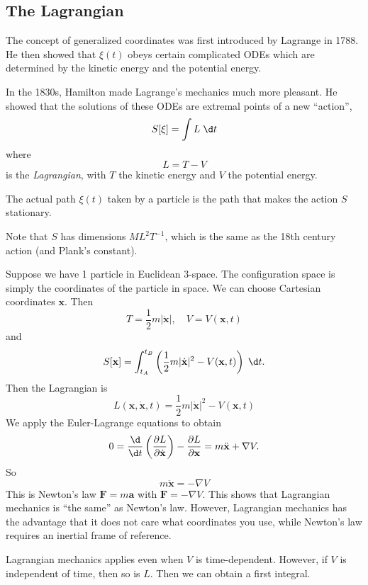\documentclass[a4paper]{article}
\begin{document}
\subsection{The Lagrangian}
The concept of generalized coordinates was first introduced by Lagrange in 1788. He then showed that $\xi(t)$ obeys certain complicated ODEs which are determined by the kinetic energy and the potential energy.

In the 1830s, Hamilton made Lagrange's mechanics much more pleasant. He showed that the solutions of these ODEs are extremal points of a new ``action'',
\[
  S[\xi] = \int L\;\d t
\]
where
\[
  L = T - V
\]
is the \emph{Lagrangian}, with $T$ the kinetic energy and $V$ the potential energy.

\begin{law}
  The actual path $\xi(t)$ taken by a particle is the path that makes the action $S$ stationary.
\end{law}

Note that $S$ has dimensions $ML^2T^{-1}$, which is the same as the 18th century action (and Plank's constant).

\begin{eg}
  Suppose we have 1 particle in Euclidean 3-space. The configuration space is simply the coordinates of the particle in space. We can choose Cartesian coordinates $\mathbf{x}$. Then
  \[
    T = \frac{1}{2}m|\dot{\mathbf{x}}|,\quad V = V(\mathbf{x}, t)
  \]
  and
  \[
    S[\mathbf{x}] = \int_{t_A}^{t_B}\left(\frac{1}{2}m|\dot{\mathbf{x}}|^2 - V(\mathbf{x}, t)\right)\;\d t.
  \]
  Then the Lagrangian is
  \[
    L(\mathbf{x}, \dot{\mathbf{x}}, t) = \frac{1}{2}m|\dot{\mathbf{x}}|^2 - V(\mathbf{x}, t)
  \]
  We apply the Euler-Lagrange equations to obtain
  \[
    0 = \frac{\d}{\d t}\left(\frac{\partial L}{\partial \dot{\mathbf{x}}}\right) - \frac{\partial L}{\partial \mathbf{x}} = m\ddot{\mathbf{x}} + \nabla V.
  \]
  So
  \[
    m\ddot{\mathbf{x}} = -\nabla V
  \]
  This is Newton's law $\mathbf{F} = m\mathbf{a}$ with $\mathbf{F} = -\nabla V$. This shows that Lagrangian mechanics is ``the same'' as Newton's law. However, Lagrangian mechanics has the advantage that it does not care what coordinates you use, while Newton's law requires an inertial frame of reference.
\end{eg}
Lagrangian mechanics applies even when $V$ is time-dependent. However, if $V$ is independent of time, then so is $L$. Then we can obtain a first integral.
\end{document}
